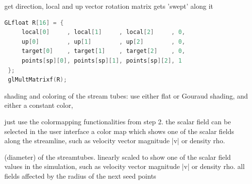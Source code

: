  get direction, local and up vector
 rotation matrix
 gets 'swept' along it


 \begin{lstlisting}[language=C, caption={Rotation and translation matrix to move cross-section along the streamtube.}]
 GLfloat R[16] = {
     local[0]     , local[1]     , local[2]     , 0,
     up[0]        , up[1]        , up[2]        , 0,
     target[0]    , target[1]    , target[2]    , 0,
     points[sp][0], points[sp][1], points[sp][2], 1
 };
 glMultMatrixf(R);
 \end{lstlisting}
 
 shading and coloring of the stream tubes: use either flat or Gouraud shading, and either a constant color,
 
 just use the colormapping functionalities from step 2. 
 the scalar field can be selected in the user interface
 a color map which shows one of the scalar fields along the streamline, such as velocity vector magnitude |v| or density rho.


(diameter) of the streamtubes. 
linearly scaled to show one of the scalar field values in the simulation, such as velocity vector magnitude |v| or density rho. 
all fields
affected by the radius of the next seed points



